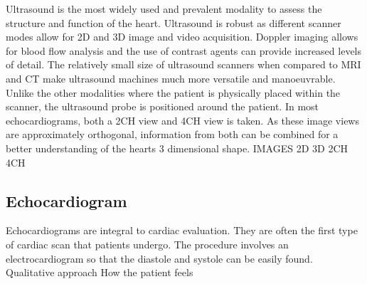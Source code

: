 \documentclass[12pt]{article}
\begin{document}
Ultrasound is the most widely used and prevalent modality to assess the structure and function of the heart.
Ultrasound is robust as different scanner modes allow for 2D and 3D image and video acquisition.
Doppler imaging allows for blood flow analysis and the use of contrast agents can provide increased levels of detail.
The relatively small size of ultrasound scanners when compared to MRI and CT make ultrasound machines much more versatile and manoeuvrable.
Unlike the other modalities where the patient is physically placed within the scanner, the ultrasound probe is positioned around the patient.
In most echocardiograms, both a 2CH view and 4CH view is taken. 
As these image views are approximately orthogonal, information from both can be combined for a better understanding of the hearts 3 dimensional shape.
IMAGES
2D
3D
2CH
4CH

\subsection{Echocardiogram}
Echocardiograms are integral to cardiac evaluation.
They are often the first type of cardiac scan that patients undergo.
The procedure involves an electrocardiogram so that the diastole and systole can be easily found.
Qualitative approach
How the patient feels
\end{document}
